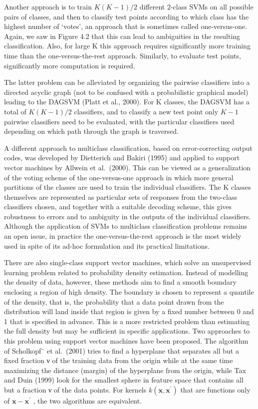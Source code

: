 \documentclass[
  10
]{article}
\begin{document}
Another approach is to train \(K ( K - 1 ) / 2\) different 2-class SVMs
on all possible pairs of classes, and then to classify test points
according to which class has the highest number of `votes', an approach
that is sometimes called one-versus-one. Again, we saw in Figure 4.2
that this can lead to ambiguities in the resulting classification. Also,
for large K this approach requires significantly more training time than
the one-versus-the-rest approach. Similarly, to evaluate test points,
significantly more computation is required.

The latter problem can be alleviated by organizing the pairwise
classifiers into a directed acyclic graph (not to be confused with a
probabilistic graphical model) leading to the DAGSVM (Platt et al.,
2000). For K classes, the DAGSVM has a total of \(K ( K - 1 ) / 2\)
classifiers, and to classify a new test point only \(K - 1\) pairwise
classifiers need to be evaluated, with the particular classifiers used
depending on which path through the graph is traversed.

A different approach to multiclass classification, based on
error-correcting output codes, was developed by Dietterich and Bakiri
(1995) and applied to support vector machines by Allwein et al.~(2000).
This can be viewed as a generalization of the voting scheme of the
one-versus-one approach in which more general partitions of the classes
are used to train the individual classifiers. The K classes themselves
are represented as particular sets of responses from the two-class
classifiers chosen, and together with a suitable decoding scheme, this
gives robustness to errors and to ambiguity in the outputs of the
individual classifiers. Although the application of SVMs to multiclass
classification problems remains an open issue, in practice the
one-versus-the-rest approach is the most widely used in spite of its
ad-hoc formulation and its practical limitations.

There are also single-class support vector machines, which solve an
unsupervised learning problem related to probability density estimation.
Instead of modelling the density of data, however, these methods aim to
find a smooth boundary enclosing a region of high density. The boundary
is chosen to represent a quantile of the density, that is, the
probability that a data point drawn from the distribution will land
inside that region is given by a fixed number between 0 and 1 that is
specified in advance. This is a more restricted problem than estimating
the full density but may be sufficient in specific applications. Two
approaches to this problem using support vector machines have been
proposed. The algorithm of Scholkopf¨ et al.~(2001) tries to find a
hyperplane that separates all but a fixed fraction ν of the training
data from the origin while at the same time maximizing the distance
(margin) of the hyperplane from the origin, while Tax and Duin (1999)
look for the smallest sphere in feature space that contains all but a
fraction ν of the data points. For kernels
\(k ( \mathbf { x } , \mathbf { x } ^ { \prime } )\) that are functions
only of \(\mathbf { x } - \mathbf { x } ^ { \prime }\) , the two
algorithms are equivalent.
\end{document}
